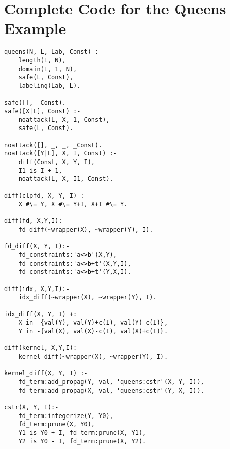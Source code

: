 \documentclass{llncs}
\begin{document}
\appendix

\section{Complete Code for the Queens Example}
\label{sec:queens-example-using}
\small
\begin{lstlisting}
queens(N, L, Lab, Const) :-
	length(L, N),
	domain(L, 1, N),
	safe(L, Const),
	labeling(Lab, L).

safe([], _Const).
safe([X|L], Const) :-
	noattack(L, X, 1, Const),
	safe(L, Const).

noattack([], _, _, _Const).
noattack([Y|L], X, I, Const) :-
	diff(Const, X, Y, I),
	I1 is I + 1,
	noattack(L, X, I1, Const).

diff(clpfd, X, Y, I) :-
 	X #\= Y, X #\= Y+I, X+I #\= Y.

diff(fd, X,Y,I):-
	fd_diff(~wrapper(X), ~wrapper(Y), I).

fd_diff(X, Y, I):-
	fd_constraints:'a<>b'(X,Y),
	fd_constraints:'a<>b+t'(X,Y,I),
	fd_constraints:'a<>b+t'(Y,X,I).

diff(idx, X,Y,I):-
	idx_diff(~wrapper(X), ~wrapper(Y), I).

idx_diff(X, Y, I) +:
 	X in -{val(Y), val(Y)+c(I), val(Y)-c(I)},
 	Y in -{val(X), val(X)-c(I), val(X)+c(I)}.

diff(kernel, X,Y,I):-
	kernel_diff(~wrapper(X), ~wrapper(Y), I).

kernel_diff(X, Y, I) :-
  	fd_term:add_propag(Y, val, 'queens:cstr'(X, Y, I)),
  	fd_term:add_propag(X, val, 'queens:cstr'(Y, X, I)).

cstr(X, Y, I):-
  	fd_term:integerize(Y, Y0),
  	fd_term:prune(X, Y0),
  	Y1 is Y0 + I, fd_term:prune(X, Y1),
  	Y2 is Y0 - I, fd_term:prune(X, Y2).
\end{lstlisting}
\end{document}
